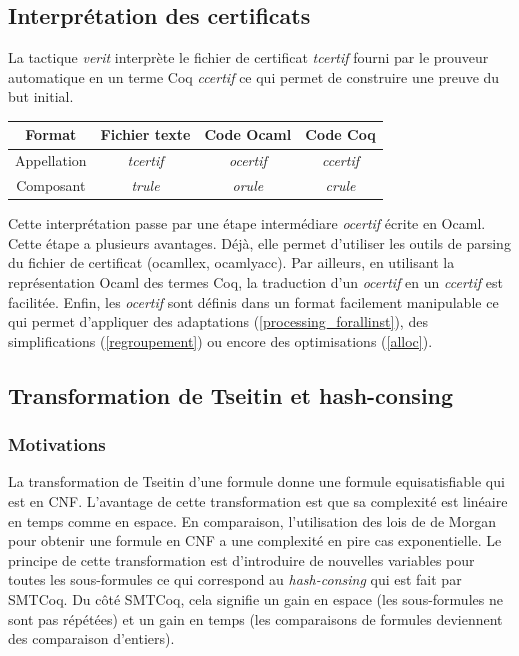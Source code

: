 \documentclass[11pt]{article}
\begin{document}
\subsection{Interprétation des certificats}

La tactique \textit{verit} interprète le fichier de certificat \textit{tcertif} fourni par le prouveur automatique en un terme Coq \textit{ccertif} ce qui permet de construire une preuve du but initial. \\

\begin{center}
\begin{tabular}{ |c||c|c|c| } 
 \hline
 Format & Fichier texte & Code Ocaml & Code Coq \\ 
 \hline
 Appellation & \textit{tcertif} & \textit{ocertif} & \textit{ccertif} \\ 
 \hline
 Composant & \textit{trule} & \textit{orule} & \textit{crule} \\ 
 \hline
\end{tabular}
\end{center}

Cette interprétation passe par une étape intermédiare \textit{ocertif} écrite en Ocaml. Cette étape a plusieurs avantages. Déjà, elle permet d'utiliser les outils de parsing du fichier de certificat (ocamllex, ocamlyacc). Par ailleurs, en utilisant la représentation Ocaml des termes Coq, la traduction d'un \textit{ocertif} en un \textit{ccertif} est facilitée. Enfin, les \textit{ocertif} sont définis dans un format facilement manipulable ce qui permet d'appliquer des adaptations (\ref{processing_forallinst}), des simplifications (\ref{regroupement}) ou encore des optimisations (\ref{alloc}).




\subsection{Transformation de Tseitin et hash-consing} \label{tseitin}

\subsubsection{Motivations}

La transformation de Tseitin d'une formule donne une formule equisatisfiable qui est en CNF. L'avantage de cette transformation est que sa complexité est linéaire en temps comme en espace. En comparaison, l'utilisation des lois de de Morgan pour obtenir une formule en CNF a une complexité en pire cas exponentielle. Le principe de cette transformation est d'introduire de nouvelles variables pour toutes les sous-formules ce qui correspond au \textit{hash-consing} qui est fait par SMTCoq. Du côté SMTCoq, cela signifie un gain en espace (les sous-formules ne sont pas répétées) et un gain en temps (les comparaisons de formules deviennent des comparaison d'entiers).
\end{document}
